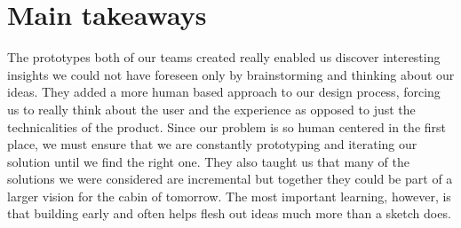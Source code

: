 \section{Main takeaways}
The prototypes both of our teams created really enabled us discover interesting insights we could not have foreseen only by brainstorming and thinking about our ideas. They added a more human based approach to our design process, forcing us to really think about the user and the experience as opposed to just the technicalities of the product. Since our problem is so human centered in the first place, we must ensure that we are constantly prototyping and iterating our solution until we find the right one. They also taught us that many of the solutions we were considered are incremental but together they could be part of a larger vision for the cabin of tomorrow. The most important learning, however, is that building early and often helps flesh out ideas much more than a sketch does.
